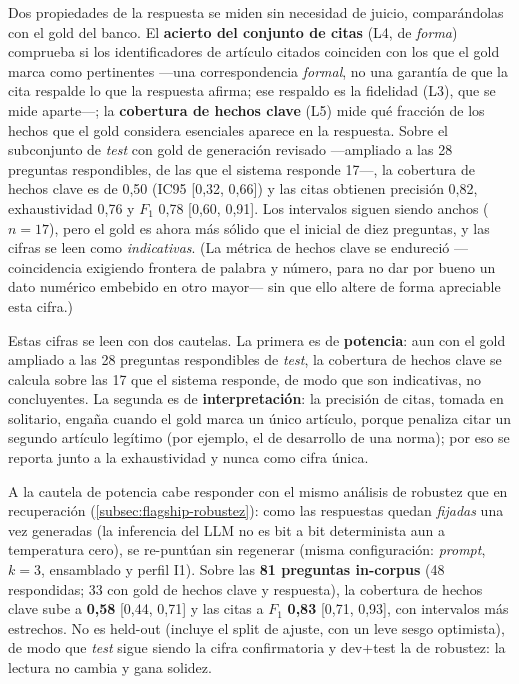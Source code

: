 Dos propiedades de la respuesta se miden sin necesidad de juicio, comparándolas con el gold del banco. El \textbf{acierto del conjunto de citas} (L4, de \emph{forma}) comprueba si los identificadores de artículo citados coinciden con los que el gold marca como pertinentes —una correspondencia \emph{formal}, no una garantía de que la cita respalde lo que la respuesta afirma; ese respaldo es la fidelidad (L3), que se mide aparte—; la \textbf{cobertura de hechos clave} (L5) mide qué fracción de los hechos que el gold considera esenciales aparece en la respuesta. Sobre el subconjunto de \emph{test} con gold de generación revisado —ampliado a las 28 preguntas respondibles, de las que el sistema responde 17—, la cobertura de hechos clave es de 0,50 (IC95 [0,32, 0,66]) y las citas obtienen precisión 0,82, exhaustividad 0,76 y $F_1$ 0,78 [0,60, 0,91]. Los intervalos siguen siendo anchos ($n=17$), pero el gold es ahora más sólido que el inicial de diez preguntas, y las cifras se leen como \emph{indicativas}. (La métrica de hechos clave se endureció —coincidencia exigiendo frontera de palabra y número, para no dar por bueno un dato numérico embebido en otro mayor— sin que ello altere de forma apreciable esta cifra.)

Estas cifras se leen con dos cautelas. La primera es de \textbf{potencia}: aun con el gold ampliado a las 28 preguntas respondibles de \emph{test}, la cobertura de hechos clave se calcula sobre las 17 que el sistema responde, de modo que son indicativas, no concluyentes. La segunda es de \textbf{interpretación}: la precisión de citas, tomada en solitario, engaña cuando el gold marca un único artículo, porque penaliza citar un segundo artículo legítimo (por ejemplo, el de desarrollo de una norma); por eso se reporta junto a la exhaustividad y nunca como cifra única.

A la cautela de potencia cabe responder con el mismo análisis de robustez que en recuperación (\ref{subsec:flagship-robustez}): como las respuestas quedan \emph{fijadas} una vez generadas (la inferencia del LLM no es bit a bit determinista aun a temperatura cero), se re-puntúan sin regenerar (misma configuración: \emph{prompt}, $k{=}3$, ensamblado y perfil I1). Sobre las \textbf{81 preguntas in-corpus} (48 respondidas; 33 con gold de hechos clave y respuesta), la cobertura de hechos clave sube a \textbf{0,58} [0,44, 0,71] y las citas a $F_1$ \textbf{0,83} [0,71, 0,93], con intervalos más estrechos. No es held-out (incluye el split de ajuste, con un leve sesgo optimista), de modo que \emph{test} sigue siendo la cifra confirmatoria y dev+test la de robustez: la lectura no cambia y gana solidez.


